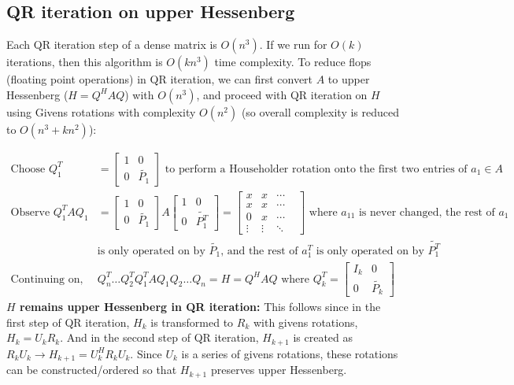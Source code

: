 \documentclass{article}
\begin{document}
\subsection{QR iteration on upper Hessenberg}
Each QR iteration step of a dense matrix is $O(n^3)$. If we run for $O(k)$ iterations, then this algorithm is $O(kn^3)$ time complexity. To reduce flops (floating point operations) in QR iteration, we can first convert $A$ to upper Hessenberg ($H = Q^HAQ$) with $O(n^3)$, and proceed with QR iteration on $H$ using Givens rotations with complexity $O(n^2)$ (so overall complexity is reduced to $O(n^3 + kn^2)$):

\begin{align*}
    \textrm{Choose } Q_1^T &= \begin{bmatrix} 1 & 0 \\ 0 & \tilde{P_1} \end{bmatrix} \textrm{ to perform a Householder rotation onto the first two entries of } a_1 \in A\\
    \textrm{Observe }Q_1^T A Q_1 &= \begin{bmatrix} 1 & 0 \\ 0 & \tilde{P_1} \end{bmatrix} A \begin{bmatrix} 1 & 0 \\ 0 & \tilde{P_1^T} \end{bmatrix} = \begin{bmatrix} x & x & \cdots & \\
        x & x & \cdots \\ 0 & x &\cdots \\ \vdots & \vdots & \ddots \end{bmatrix} \textrm{ where $a_{11}$ is never changed, the rest of $a_1$}\\
        &\textrm{is only operated on by $\tilde{P_1}$, and the rest of $a_1^T$ is only operated on by $\tilde{P_1^T}$}\\
    \textrm{Continuing on, } & Q_n^T \dots Q_2^TQ_1^T A Q_1Q_2 \dots Q_n = H = Q^HAQ \textrm{ where } Q_k^T = \begin{bmatrix} I_k & 0 \\ 0 & \tilde{P_k} \end{bmatrix}
\end{align*}
\textbf{$H$ remains upper Hessenberg in QR iteration:} This follows since in the first step of QR iteration, $H_k$ is transformed to $R_k$ with givens rotations, $H_k = U_kR_k$. And in the second step of QR iteration, $H_{k+1}$ is created as $R_kU_k \rightarrow H_{k+1} = U_k^HR_kU_k$. Since $U_k$ is a series of givens rotations, these rotations can be constructed/ordered so that $H_{k+1}$ preserves upper Hessenberg.
\end{document}
